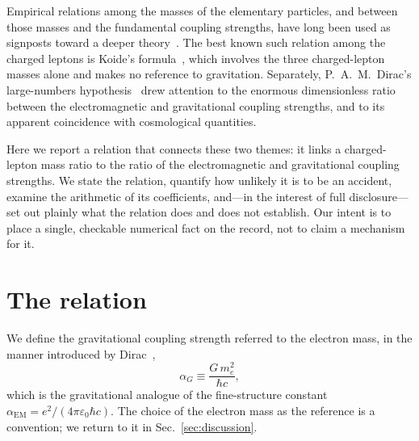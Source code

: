 \documentclass[aps,prd,preprint,amsmath,amssymb,nofootinbib]{revtex4-2}
\begin{document}
Empirical relations among the masses of the elementary particles, and between
those masses and the fundamental coupling strengths, have long been used as
signposts toward a deeper theory~\cite{koide1983,dirac1938,wesson1980}. The
best known such relation among the charged leptons is Koide's
formula~\cite{koide1983}, which involves the three charged-lepton masses alone
and makes no reference to gravitation. Separately, P.~A.~M.~Dirac's
large-numbers hypothesis~\cite{dirac1938} drew attention to the enormous
dimensionless ratio between the electromagnetic and gravitational coupling
strengths, and to its apparent coincidence with cosmological quantities.

Here we report a relation that connects these two themes: it links a
charged-lepton mass ratio to the ratio of the electromagnetic and
gravitational coupling strengths. We state the relation, quantify how unlikely
it is to be an accident, examine the arithmetic of its coefficients, and---in
the interest of full disclosure---set out plainly what the relation does and
does not establish. Our intent is to place a single, checkable numerical fact
on the record, not to claim a mechanism for it.

\section{The relation}

We define the gravitational coupling strength referred to the electron mass,
in the manner introduced by Dirac~\cite{dirac1938},
\begin{equation}
\alpha_G \equiv \frac{G\,m_e^2}{\hbar c},
\label{eq:alphaG}
\end{equation}
which is the gravitational analogue of the fine-structure constant
$\alpha_{\mathrm{EM}} = e^2/(4\pi\varepsilon_0\hbar c)$. The choice of the
electron mass as the reference is a convention; we return to it in
Sec.~\ref{sec:discussion}.
\end{document}
